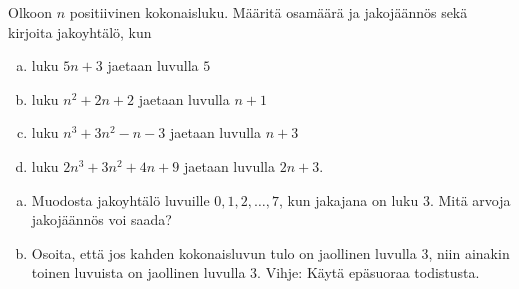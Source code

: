 \begin{tehtavasivu}
\begin{tehtava}
	Olkoon $n$ positiivinen kokonaisluku. Määritä osamäärä ja jakojäännös sekä kirjoita jakoyhtälö, kun
	\begin{enumerate}[a)]
	\item luku $5n + 3$ jaetaan luvulla $5$
	\item luku $n^2 + 2n + 2$ jaetaan luvulla $n + 1$
	\item luku $n^3 + 3n^2 - n - 3$ jaetaan luvulla $n + 3$
	\item luku $2n^3 + 3n^2 + 4n + 9$ jaetaan luvulla $2n + 3$.
	\end{enumerate}
\end{tehtava}


\begin{tehtava}
	\begin{enumerate}[a)]
	\item Muodosta jakoyhtälö luvuille $0, 1, 2, \ldots, 7$, kun jakajana on luku $3$. Mitä arvoja jakojäännös voi saada?
	\item Osoita, että jos kahden kokonaisluvun tulo on jaollinen luvulla $3$, niin ainakin toinen luvuista on jaollinen luvulla $3$. Vihje: Käytä epäsuoraa todistusta.
	\end{enumerate}
\end{tehtava}

\end{tehtavasivu}

\setcounter{tehtava}{0}

